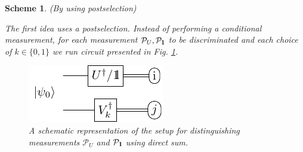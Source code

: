 \documentclass[preprint,12pt, a4paper, dvipsnames]{elsarticle}
\newcommand{\1}{{\rm 1\hspace{-0.9mm}l}}
\newcommand{\Id}{{\rm 1\hspace{-0.9mm}l}}
\newcommand{\PP}{\mathcal{P}}
\newtheorem{scheme}{Scheme}
\begin{document}
\begin{scheme}(By using postselection)

	The first idea uses a postselection. Instead of performing a conditional measurement, for each
	measurement $\PP_U, \PP_\Id$ to be discriminated and each choice of $k \in \{0, 1\}$ we run circuit presented in Fig. \ref{fig:postselection}.

	\begin{figure}[h!]
		\centering
		\includegraphics[scale=1.7]{pics/postselection_no_channels}

		\caption{
			A schematic representation of the setup for distinguishing
			measurements $\PP_{U}$ and $\PP_{\Id}$ using direct sum.
		}\label{fig:postselection}
	\end{figure}





\end{scheme}
\end{document}
